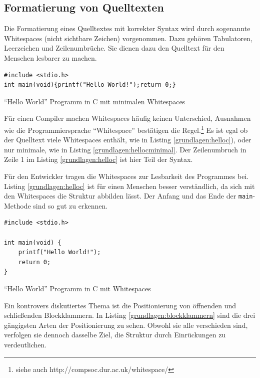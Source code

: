 \subsection{Formatierung von Quelltexten}


Die Formatierung eines Quelltextes mit korrekter Syntax wird durch
sogenannte Whitespaces (nicht sichtbare Zeichen) vorgenommen.
Dazu gehören Tabulatoren, Leerzeichen und Zeilenumbrüche. Sie dienen dazu den Quelltext für den Menschen lesbarer zu machen.

\begin{listing}[H]
    \begin{verbatim}
#include <stdio.h>
int main(void){printf("Hello World!");return 0;}
    \end{verbatim}
    \caption{\enquote{Hello World} Programm in C mit minimalen Whitespaces}
    \label{grundlagen:hellocminimal}
\end{listing}

Für einen Compiler machen Whitespaces häufig keinen Unterschied, Ausnahmen wie die Programmiersprache \enquote{Whitespace} bestätigen die Regel.\footnote{siehe auch http://compsoc.dur.ac.uk/whitespace/}
Es ist egal ob der Quelltext viele Whitespaces enthält, wie in Listing \ref{grundlagen:helloc}), oder nur minimale, wie in Listing \ref{grundlagen:hellocminimal}.
Der Zeilenumbruch in Zeile 1 im Listing \ref{grundlagen:helloc} ist hier Teil der Syntax.

Für den Entwickler tragen die Whitespaces zur Lesbarkeit des Programmes bei. Listing \ref{grundlagen:helloc} ist für einen Menschen besser verständlich, da sich mit den Whitespaces die Struktur abbilden lässt. Der Anfang und das Ende der \texttt{main}-Methode sind so gut zu erkennen.

\begin{listing}[H]
    \begin{verbatim}
#include <stdio.h>

int main(void) {
    printf("Hello World!");
    return 0;
}
    \end{verbatim}
    \caption{\enquote{Hello World} Programm in C mit Whitespaces}
    \label{grundlagen:helloc}
\end{listing}

Ein kontrovers diskutiertes Thema ist die Positionierung von öffnenden
und schließenden Blockklammern.
In Listing \ref{grundlagen:blockklammern} sind die drei gängigsten
Arten der Positionierung zu sehen. Obwohl sie alle verschieden sind, verfolgen
sie dennoch dasselbe Ziel, die Struktur durch Einrückungen zu verdeutlichen.

